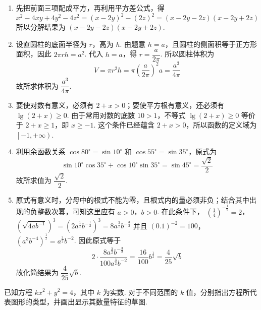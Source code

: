 \documentclass[UTF8,a4paper,oneside,11pt]{ctexbook}
\begin{document}
\begin{solution}
\begin{enumerate}
\item 先把前面三项配成平方，再利用平方差公式，得
\[
x^{2}-4xy+4y^{2}-4z^{2}=(x-2y)^{2}-(2z)^{2}=(x-2y-2z)(x-2y+2z)
\]
所以分解结果为 \((x-2y-2z)(x-2y+2z)\).

\item 设直圆柱的底面半径为 \(r\)，高为 \(h\). 由题意 \(h=a\)，且圆柱的侧面积等于正方形面积，因此 \(2\pi rh=a^{2}\). 代入 \(h=a\)，得 \(r=\dfrac{a}{2\pi}\). 所以圆柱体积为
\[
V=\pi r^{2}h=\pi\left(\frac{a}{2\pi}\right)^{2}a=\frac{a^{3}}{4\pi}
\]
故所求体积为 \(\dfrac{a^{3}}{4\pi}\).

\item 要使对数有意义，必须有 \(2+x>0\)；要使平方根有意义，还必须有 \(\lg(2+x)\geqslant0\). 由于常用对数的底数 \(10>1\)，不等式 \(\lg(2+x)\geqslant0\) 等价于 \(2+x\geqslant1\)，即 \(x\geqslant-1\). 这个条件已经蕴含 \(2+x>0\)，所以函数的定义域为 \(\left[-1,+\infty\right)\).

\item 利用余函数关系 \(\cos80^{\circ}=\sin10^{\circ}\) 和 \(\cos55^{\circ}=\sin35^{\circ}\)，原式为
\[
\sin10^{\circ}\cos35^{\circ}+\cos10^{\circ}\sin35^{\circ}=\sin45^{\circ}=\frac{\sqrt{2}}{2}
\]
故所求值为 \(\dfrac{\sqrt{2}}{2}\).

\item 原式有意义时，分母中的根式不能为零，且根式内的量必须非负；结合其中出现的负整数次幂，可知这里应有 \(a>0\)，\(b>0\). 在此条件下，
\(\left(\frac{1}{4}\right)^{-\frac{1}{2}}=2\)，\(\left(\sqrt{4ab^{-1}}\right)^{3}=\left(2a^{\frac{1}{2}}b^{-\frac{1}{2}}\right)^{3}=8a^{\frac{3}{2}}b^{-\frac{3}{2}}\)
并且
\((0.1)^{-2}=100\)，\(\left(a^{3}b^{-4}\right)^{\frac{1}{2}}=a^{\frac{3}{2}}b^{-2}\).
因此原式等于
\[
2\cdot\frac{8a^{\frac{3}{2}}b^{-\frac{3}{2}}}{100a^{\frac{3}{2}}b^{-2}}
=\frac{16}{100}b^{\frac{1}{2}}
=\frac{4}{25}\sqrt{b}
\]
故化简结果为 \(\dfrac{4}{25}\sqrt{b}\).
\end{enumerate}
\end{solution}

\begin{problem}
已知方程 \(kx^{2}+y^{2}=4\)，其中 \(k\) 为实数. 对于不同范围的 \(k\) 值，分别指出方程所代表图形的类型，并画出显示其数量特征的草图.
\end{problem}
\end{document}
